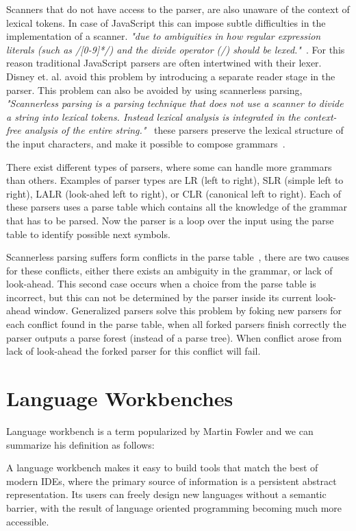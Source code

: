 Scanners that do not have access to the parser, are also unaware of the context of lexical tokens. In case of JavaScript this can impose subtle difficulties in the implementation of a scanner. \textit{"due to ambiguities in how regular expression literals (such as /[0-9]*/) and the divide operator (/) should be lexed."}~\cite{Disney2014}. For this reason traditional JavaScript parsers are often intertwined with their lexer. Disney et. al. avoid this problem by introducing a separate reader stage in the parser. This problem can also be avoided by using scannerless parsing, \textit{"Scannerless parsing is a parsing technique that does not use a scanner to divide a string into lexical tokens. Instead lexical analysis is integrated in the context-free analysis of the entire string."}~\cite{Visser1997} these parsers preserve the lexical structure of the input characters, and make it possible to compose grammars~\cite{Visser1997}.

There exist different types of parsers, where some can handle more grammars than others. Examples of parser types are LR (left to right), SLR (simple left to right), LALR (look-ahed left to right), or CLR (canonical left to right). Each of these parsers uses a parse table which contains all the knowledge of the grammar that has to be parsed. Now the parser is a loop over the input using the parse table to identify possible next symbols.

Scannerless parsing suffers form conflicts in the parse table~\cite{Visser1997}, there are two causes for these conflicts, either there exists an ambiguity in the grammar, or lack of look-ahead. This second case occurs when a choice from the parse table is incorrect, but this can not be determined by the parser inside its current look-ahead window. Generalized parsers solve this problem by foking new parsers for each conflict found in the parse table, when all forked parsers finish correctly the parser outputs a parse forest (instead of a parse tree). When conflict arose from lack of look-ahead the forked parser for this conflict will fail.

\section{Language Workbenches} \label{rascal}

Language workbench is a term popularized by Martin Fowler and we can summarize his definition as follows:

A language workbench makes it easy to build tools that match the best of modern IDEs, where the primary source of information is a persistent abstract representation. Its users can freely design new languages without a semantic barrier, with the result of language oriented programming becoming much more accessible.~\cite{Fowler2005}

